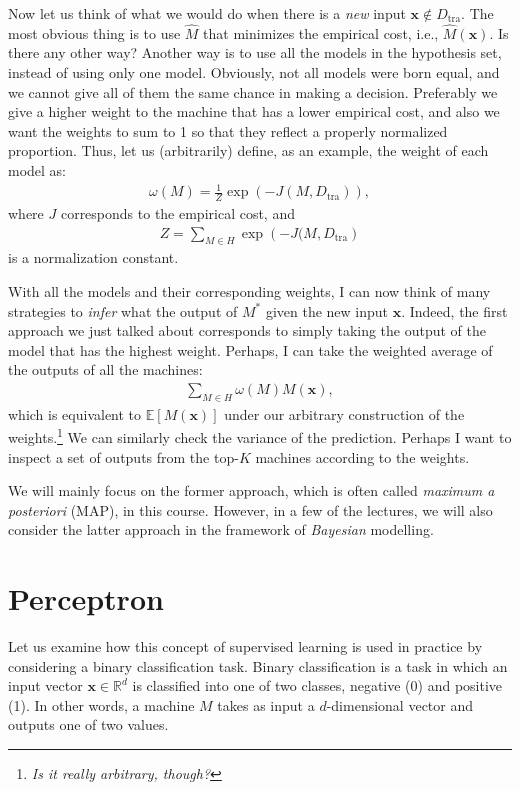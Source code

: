\documentclass{report}
\newcommand{\vect}[1]{\mathbf{#1}}
\newcommand{\vx}[0]{\vect{x}}
\begin{document}
Now let us think of what we would do when there is a {\it new} input $\vx \notin
D_{\text{tra}}$. The most obvious thing is to use $\hat{M}$ that minimizes the
empirical cost, i.e., $\hat{M}(\vx)$. Is there any other way? Another way is to
use all the models in the hypothesis set, instead of using only one model.
Obviously, not all models were born equal, and we cannot give all of them the
same chance in making a decision. Preferably we give a higher weight to the
machine that has a lower empirical cost, and also we want the weights to sum to
1 so that they reflect a properly normalized proportion. Thus, let us
(arbitrarily) define, as an example, the weight of each model as:
\begin{align*}
    \omega(M) = \frac{1}{Z} \exp\left( -J(M, D_{\text{tra}} ) \right),
\end{align*}
where $J$ corresponds to the empirical cost, and 
\begin{align*}
    Z = \sum_{M \in H} \exp\left( -J(M, D_{\text{tra}} \right)
\end{align*}
is a normalization constant. 

With all the models and their corresponding weights, I can now think of many
strategies to {\it infer} what the output of $M^*$ given the new input $\vx$.
Indeed, the first approach we just talked about corresponds to simply taking the
output of the model that has the highest weight. Perhaps, I can take the
weighted average of the outputs of all the machines:
\begin{align}
    \label{eq:bayes0}
    \sum_{M \in H} \omega(M) M(\vx),
\end{align}
which is equivalent to $\mathbb{E}\left[ M(\vx) \right]$ under our arbitrary
construction of the weights.\footnote{
    {\it Is it really arbitrary, though?}
} We can similarly check the variance of the prediction. Perhaps I want to
inspect a set of outputs from the top-$K$ machines according to the weights.

We will mainly focus on the former approach, which is often called {\it maximum
a posteriori} (MAP), in this course. However, in a few of the lectures, we will
also consider the latter approach in the framework of {\it Bayesian} modelling.


\section{Perceptron}
\label{sec:perceptron}

Let us examine how this concept of supervised learning is used in practice by
considering a binary classification task. Binary classification is a task in
which an input vector $\vx \in \mathbb{R}^d$ is classified into one of two
classes, negative (0) and positive (1). In other words, a machine $M$ takes as
input a $d$-dimensional vector and outputs one of two values. 
\end{document}

